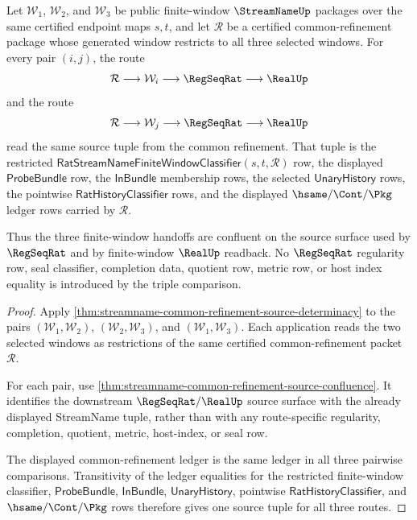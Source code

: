 \begin{theorem}
\label{thm:streamname-common-refinement-source-triple-confluence}
Let $\mathcal W_1$, $\mathcal W_2$, and $\mathcal W_3$ be public
finite-window $\StreamNameUp$ packages over the same certified endpoint maps
$s,t$, and let $\mathcal R$ be a certified common-refinement package whose
generated window restricts to all three selected windows. For every pair
$(i,j)$, the route
$$
\mathcal R\longrightarrow \mathcal W_i\longrightarrow \RegSeqRat
\longrightarrow \RealUp
$$
and the route
$$
\mathcal R\longrightarrow \mathcal W_j\longrightarrow \RegSeqRat
\longrightarrow \RealUp
$$
read the same source tuple from the common refinement. That tuple is the
restricted $\mathsf{RatStreamNameFiniteWindowClassifier}(s,t,\mathcal R)$
row, the displayed $\mathsf{ProbeBundle}$ row, the $\mathsf{InBundle}$
membership rows, the selected $\mathsf{UnaryHistory}$ rows, the pointwise
$\mathsf{RatHistoryClassifier}$ rows, and the displayed
$\hsame/\Cont/\Pkg$ ledger rows carried by $\mathcal R$.

Thus the three finite-window handoffs are confluent on the source surface
used by $\RegSeqRat$ and by finite-window $\RealUp$ readback. No
$\RegSeqRat$ regularity row, seal classifier, completion data, quotient row,
metric row, or host index equality is introduced by the triple comparison.
\end{theorem}
\begin{proof}
Apply \autoref{thm:streamname-common-refinement-source-determinacy} to the
pairs $(\mathcal W_1,\mathcal W_2)$, $(\mathcal W_2,\mathcal W_3)$, and
$(\mathcal W_1,\mathcal W_3)$. Each application reads the two selected
windows as restrictions of the same certified common-refinement packet
$\mathcal R$.

For each pair, use
\autoref{thm:streamname-common-refinement-source-confluence}. It identifies
the downstream $\RegSeqRat/\RealUp$ source surface with the already displayed
StreamName tuple, rather than with any route-specific regularity, completion,
quotient, metric, host-index, or seal row.

The displayed common-refinement ledger is the same ledger in all three
pairwise comparisons. Transitivity of the ledger equalities for the
restricted finite-window classifier, $\mathsf{ProbeBundle}$,
$\mathsf{InBundle}$, $\mathsf{UnaryHistory}$, pointwise
$\mathsf{RatHistoryClassifier}$, and $\hsame/\Cont/\Pkg$ rows therefore gives
one source tuple for all three routes.
\end{proof}
